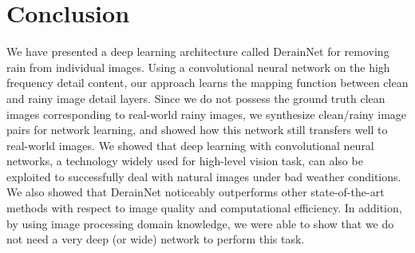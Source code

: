 \documentclass[journal]{IEEEtran}
\begin{document}
\section{Conclusion}
We have presented a deep learning architecture called DerainNet for removing rain from individual images. Using a convolutional neural network on the high frequency detail content, our approach learns the mapping function between clean and rainy image detail layers. Since we do not possess the ground truth clean images corresponding to real-world rainy images, we synthesize clean/rainy image pairs for network learning, and showed how this network still transfers well to real-world images. We showed that deep learning with convolutional neural networks, a technology widely used for high-level vision task, can also be exploited to successfully deal with natural images under bad weather conditions. We also showed that DerainNet noticeably outperforms other state-of-the-art methods with respect to image quality and computational efficiency. In addition, by using image processing domain knowledge, we were able to show that we do not need a very deep (or wide) network to perform this task.

\ifCLASSOPTIONcaptionsoff
  \newpage
\fi



\end{document}
